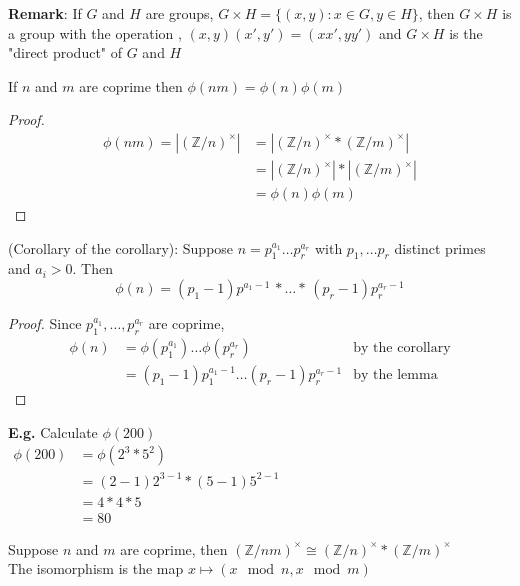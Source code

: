\documentclass[11pt]{article}
\begin{document}
\textbf{Remark}: If $G$ and $H$ are groups, $G\times H  = \{ (x,y): x \in G, y \in H \}$, then $G\times H$ is a group with the operation , $(x, y)(x',y') = (xx',yy')$ and $G \times H$ is the "direct product" of $G$ and $H$ 
\begin{corollary}
	If $n$ and $m$ are coprime then $\phi(nm) = \phi(n)\phi(m)$
\end{corollary}
\begin{proof}
	\begin{align*}
		\phi(nm) = | (\mathbb{Z}/n)^\times | &= |(\mathbb{Z}/n)^\times * (\mathbb{Z}/m)^\times |\\
		&= |(\mathbb{Z}/n)^\times| * |(\mathbb{Z}/m)^\times|\\
		&= \phi(n) \phi(m)
	\end{align*}
\end{proof}
\begin{corollary}
	(Corollary of the corollary): Suppose $n = p_{1}^{a_1} \dots p_{r}^{a_r}$ with $p_1, \dots p_r$ distinct primes and $a_i > 0 $. Then 
	\begin{equation*}
		\phi(n) = (p_1 - 1)p^{a_1 - 1} \hspace{2pt}* \dots *\hspace{2pt} (p_r - 1)p_{r}^{a_r -1} 
	\end{equation*}
\end{corollary}

\begin{proof}
	Since $p_1^{a_1}, \dots, p_r^{a_r}$ are coprime,\\
	\begin{align*}
		\phi(n) & = \phi(p_1^{a_1}) \dots \phi(p_r^{a_r})&\text{by the corollary}\\
		& = (p_1 - 1)p_1^{a_1 - 1} \dots (p_r -1)p_r^{a_r-1} &\text{by the lemma} 
	\end{align*}
\end{proof}

\textbf{E.g.} Calculate $\phi(200)$
\begin{align*}
	\phi(200) &= \phi(2^3 * 5^2) &\hspace{300pt}\\
	&= (2-1)2^{3-1} * (5-1)5^{2-1}\\
	& = 4*4*5\\
	& = 80
\end{align*}

\begin{theorem}
	Suppose $n$ and $m$ are coprime, then $(\mathbb{Z}/nm)^\times \cong (\mathbb{Z}/n)^\times * (\mathbb{Z}/m)^\times$\\
	The isomorphism is the map $x \mapsto (x \mod n, x \mod m)$
\end{theorem}
\end{document}
